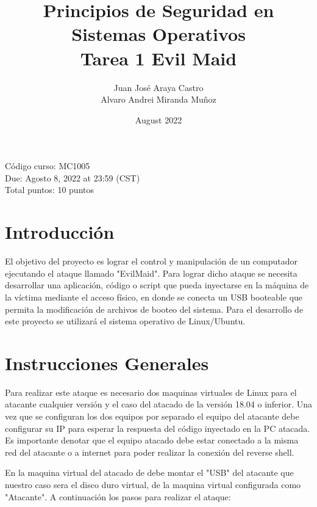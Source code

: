 \documentclass{article}
\title{Principios de Seguridad en Sistemas Operativos \\ Tarea 1 Evil Maid}
\author{Juan José Araya Castro \\
Alvaro Andrei Miranda Muñoz}
\date{August 2022}
\begin{document}
\maketitle

\begin{minipage}{\textwidth}
Código curso: MC1005\\
Due: Agosto 8, 2022 at 23:59 (CST)\\
Total puntos: 10 puntos\\
\end{minipage}
    
\section*{Introducción}
El objetivo del proyecto es lograr el control y manipulación de un computador ejecutando el ataque llamado "EvilMaid". Para lograr dicho ataque se necesita desarrollar una aplicación, código o script que pueda inyectarse en la máquina de la víctima mediante el acceso físico, en donde se conecta un USB booteable que permita la modificación de archivos de booteo del sistema. Para el desarrollo de este proyecto se utilizará el sistema operativo de Linux/Ubuntu.

\section*{Instrucciones Generales}

Para realizar este ataque es necesario dos maquinas virtuales de Linux para el atacante cualquier versión y el caso del atacado de la versión 18.04 o inferior. Una vez que se configuran los dos equipos por separado el equipo del atacante debe configurar su IP para esperar la respuesta del código inyectado en la PC atacada. Es importante denotar que el equipo atacado debe estar conectado a la misma red del atacante o a internet para poder realizar la conexión del reverse shell.

En la maquina virtual del atacado de debe montar el "USB" del atacante que nuestro caso sera el disco duro virtual, de la maquina virtual configurada como "Atacante". A continuación los pasos para realizar el ataque:
\end{document}
